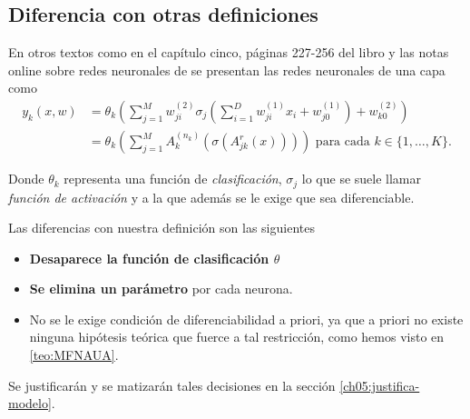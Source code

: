\subsection*{Diferencia con otras definiciones}  \label{subsection:diferencia-otras-definiciones-RRNN}

En otros textos como en el capítulo cinco, páginas 227-256 del libro \cite{BishopPaterRecognition} y las notas online sobre redes neuronales de \cite{MostafaLearningFromData} se presentan las redes neuronales de una capa como 
\begin{align}
    y_k(x,w) &= \theta_k 
    \left( 
        \sum^M_{j=1} w_{ji}^{(2)}
        \sigma_j 
        \left(
            \sum_{i=1}^D w_{ji}^{(1)} x_i + w_{j0}^{(1)}
        \right)
        + w_{k0}^{(2)}
    \right) 
    \\
    & = 
    \theta_k 
    \left( 
        \sum^M_{j=1} A^{(n_k)}_{k}
        \left(
            \sigma 
            \left(
                A^{r}_{j k}
                \left(
                    x
                \right)
            \right)
        \right)
    \right)
    \text{ para cada  } k \in \{1, \ldots, K \}.
\end{align}

Donde $\theta_k$ representa una función de \textit{clasificación}, 
$\sigma_j$ lo que se suele llamar \textit{función de activación} y a la que además se le exige que sea diferenciable.

Las diferencias con nuestra definición son las siguientes 
\begin{itemize}
    \item \textbf{Desaparece la función de clasificación $\theta$}
    \item \textbf{Se elimina un parámetro} por cada neurona. 
    \item No se le exige condición de diferenciabilidad a priori, ya que a priori no existe ninguna hipótesis teórica que fuerce a tal restricción, como hemos visto en \ref{teo:MFNAUA}.
\end{itemize}
Se justificarán y se matizarán tales decisiones en 
la sección \ref{ch05:justifica-modelo}.
